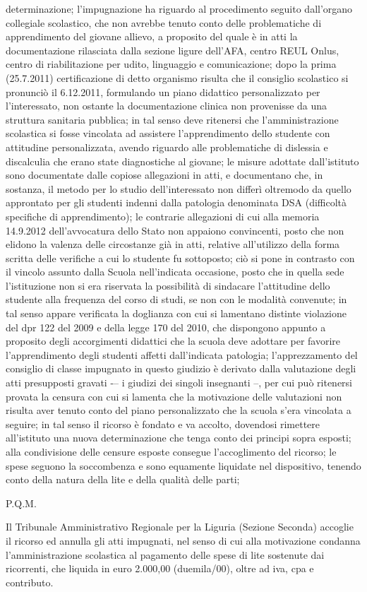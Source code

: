 determinazione; l'impugnazione ha riguardo al procedimento seguito dall'organo collegiale scolastico, che non avrebbe tenuto conto delle problematiche di apprendimento del giovane allievo, a proposito del quale è in atti la documentazione rilasciata dalla sezione ligure dell'AFA, centro REUL Onlus, centro di riabilitazione per udito, linguaggio e comunicazione;
dopo la prima (25.7.2011) certificazione di detto organismo risulta che il consiglio scolastico si pronunciò il 6.12.2011, formulando un piano didattico personalizzato per l'interessato, non ostante la documentazione clinica non provenisse da una struttura sanitaria pubblica; in tal senso deve ritenersi che l'amministrazione scolastica si fosse vincolata ad assistere l'apprendimento dello studente con attitudine personalizzata, avendo riguardo alle problematiche di dislessia e discalculia che erano state diagnostiche al giovane; le misure adottate dall'istituto sono documentate dalle copiose allegazioni in atti, e documentano che, in sostanza, il metodo per lo studio dell'interessato non differì oltremodo da quello approntato per gli studenti indenni dalla patologia denominata DSA (difficoltà specifiche di apprendimento);
le contrarie allegazioni di cui alla memoria 14.9.2012 dell'avvocatura dello Stato non appaiono convincenti, posto che non elidono la valenza delle circostanze già in atti, relative all'utilizzo della forma scritta delle verifiche a cui lo studente fu sottoposto; ciò si pone in contrasto con il vincolo assunto dalla Scuola nell'indicata occasione, posto che in quella sede l'istituzione non si era riservata la possibilità di sindacare l'attitudine dello studente alla frequenza del corso di studi, se non con le modalità convenute; in tal senso appare verificata la doglianza con cui si lamentano distinte violazione del dpr 122 del 2009 e della legge 170 del 2010, che dispongono appunto a proposito degli accorgimenti didattici che la scuola deve adottare per favorire l'apprendimento degli studenti affetti dall'indicata patologia; l'apprezzamento del consiglio di classe impugnato in questo giudizio è derivato dalla valutazione degli atti presupposti gravati -– i giudizi dei singoli insegnanti --,
per cui può ritenersi provata la censura con cui si lamenta che la motivazione delle valutazioni non risulta aver tenuto conto del piano personalizzato che la scuola s'era vincolata a seguire;
in tal senso il ricorso è fondato e va accolto, dovendosi rimettere all'istituto una nuova determinazione che tenga conto dei principi sopra esposti; alla condivisione delle censure esposte consegue l'accoglimento del ricorso;
le spese seguono la soccombenza e sono equamente liquidate nel dispositivo, tenendo conto della natura della lite e della qualità delle parti;
\begin{center}
P.Q.M.
\end{center}
Il Tribunale Amministrativo Regionale per la Liguria (Sezione Seconda) accoglie il ricorso ed annulla gli atti impugnati, nel senso di cui alla motivazione condanna l'amministrazione scolastica al pagamento delle spese di lite sostenute dai ricorrenti, che liquida in euro 2.000,00 (duemila/00), oltre ad iva, cpa e
contributo.

